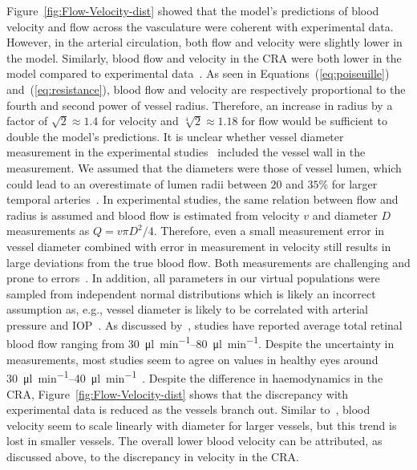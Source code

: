 \documentclass[11pt,]{article}
\begin{document}
Figure~\ref{fig:Flow-Velocity-dist} showed that the model's predictions of blood velocity and flow across the vasculature were coherent with experimental data.
However, in the arterial circulation, both flow and velocity were slightly lower in the model\cite{Riva1985,DoblhoffDier2014}.
Similarly, blood flow and velocity in the CRA were both lower in the model compared to experimental data~\cite{DoblhoffDier2014,Riva1985,Dorner2009,Feke_1989}.
As seen in Equations~(\ref{eq:poiseuille}) and~(\ref{eq:resistance}), blood flow and velocity are respectively proportional to the fourth and second power of vessel radius.
Therefore, an increase in radius by a factor of $\sqrt{2}\approx 1.4$ for velocity and $\sqrt[4]{2}\approx 1.18$ for flow would be sufficient to double the model's predictions.
It is unclear whether vessel diameter measurement in the experimental studies~\cite{DoblhoffDier2014,Riva1985} included the vessel wall in the measurement.
We assumed that the diameters were those of vessel lumen, which could lead to an overestimate of lumen radii between $20$ and $35\%$ for larger temporal arteries~\cite{Arichika2016,Damian_2021,Meixner_2015}.
In experimental studies, the same relation between flow and radius is assumed and blood flow is estimated from velocity $v$ and diameter $D$ measurements as $Q=v\pi D^2/4$.
Therefore, even a small measurement error in vessel diameter combined with error in measurement in velocity still results in large deviations from the true blood flow.
Both measurements are challenging and prone to errors~\cite{Leitgeb_2014}.
In addition, all parameters in our virtual populations were sampled from independent normal distributions which is likely an incorrect assumption as, e.g., vessel diameter is likely to be correlated with arterial pressure and IOP~\cite{Dziedziak_2022}.
As discussed by~\cite{DoblhoffDier2014}, studies have reported average total retinal blood flow ranging from \SIrange[per-mode=symbol]{30}{80}{\micro\litre\per\minute}\cite{DoblhoffDier2014,Riva1985,Feke_1989}.
Despite the uncertainty in measurements, most studies seem to agree on values in healthy eyes around \SIrange{30}{40}{\micro\litre\per\minute}~\cite{DoblhoffDier2014,Riva1985}.
Despite the difference in haemodynamics in the CRA, Figure~\ref{fig:Flow-Velocity-dist} shows that the discrepancy with experimental data is reduced as the vessels branch out.
Similar to~\cite{DoblhoffDier2014}, blood velocity seem to scale linearly with diameter for larger vessels, but this trend is lost in smaller vessels.
The overall lower blood velocity can be attributed, as discussed above, to the discrepancy in velocity in the CRA.
\end{document}
